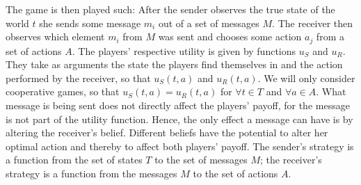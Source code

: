 \documentclass[10]{article}
\begin{document}
The game is then played such: After the sender observes the true state of the world $t$ she sends some message $m_i$ out of a set of messages $M$.
The receiver then observes which element $m_i$ from $M$ was sent and chooses some action $a_j$ from a set of actions $A$.
The players' respective utility is given by functions $u_S$ and $u_R$. They take as arguments the state the players find themselves in and the action performed by the receiver, so that $u_S(t,a)$ and $u_R(t,a)$. We will only consider cooperative games, so that $u_S(t,a)=u_R(t,a)$ for $\forall t\in T$ and $\forall a\in A$.
What message is being sent does not directly affect the players' payoff, for the message is not part of the utility function. Hence, the only effect a message can have is by altering the receiver's belief. Different beliefs have the potential to alter her optimal action and thereby to affect both players' payoff.
The sender's strategy is a function from the set of states $T$ to the set of messages $M$; the receiver's strategy is a function from the messages $M$ to the set of actions $A$. 
\end{document}
